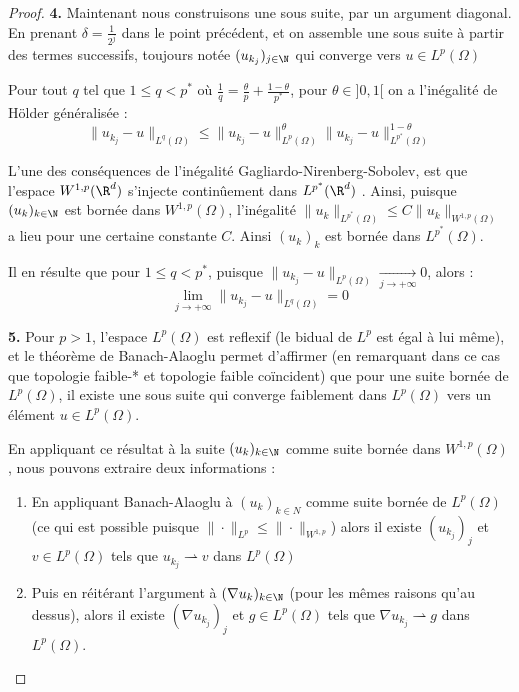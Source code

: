 \begin{proof}
    \vspace{1em}

    \textbf{4.}
    Maintenant nous construisons une sous suite, par un argument diagonal. En prenant $\delta = \frac{1}{2^j}$ dans le point précédent, et on assemble une sous suite à partir des termes successifs, toujours notée $(u_{k_j})_{j \in \N}$ qui converge vers $u \in L^p(\Omega)$

    Pour tout $q$ tel que $1 \leq q < p^*$ où $\frac{1}{q} = \frac{\theta}{p} + \frac{1 - \theta}{p^*}$, pour $\theta \in ]0,1[$ on a l'inégalité de Hölder généralisée :
    $$\|u_{k_j} - u\|_{L^q(\Omega)} \leq \|u_{k_j} - u\|_{L^p(\Omega)}^{\theta} \|u_{k_j} - u\|_{L^{p^*}(\Omega)}^{1 - \theta} $$

    L'une des conséquences de l'inégalité Gagliardo-Nirenberg-Sobolev, est que l'espace $W^{1,p}(\R^d)$ s'injecte continûement dans $L^{p^*}(\R^d)$ \cite{Evans}.
    Ainsi, puisque $(u_k)_{k \in \N}$ est bornée dans $W^{1,p}(\Omega)$, l'inégalité $\| u_k \|_{L^{p^*}(\Omega)} \leq C \| u_k \|_{W^{1,p}(\Omega)} $ a lieu pour une certaine constante $C$. Ainsi $(u_k)_k$ est bornée dans $L^{p^*}(\Omega)$. 
    
    Il en résulte que pour $1 \leq q < p^* $, puisque $\|u_{k_j} - u \|_{L^p(\Omega)} \xrightarrow[j \to +\infty]{} 0$, alors :
    $$\underset{j \to +\infty}{\lim} \| u_{k_j} - u \|_{L^q(\Omega)} = 0 $$


    \vspace{1em}

    \textbf{5.}
    Pour $p>1$, l'espace $L^p(\Omega)$ est reflexif (le bidual de $L^p$ est égal à lui même), et le théorème de Banach-Alaoglu permet d'affirmer (en remarquant dans ce cas que topologie faible-* et topologie faible coïncident)
    que pour une suite bornée de $L^p(\Omega)$, il existe une sous suite qui converge faiblement dans $L^p(\Omega)$ vers un élément $u \in L^p(\Omega)$.
    
    En appliquant ce résultat à la suite $(u_k)_{k \in \N}$ comme suite bornée dans $W^{1,p}(\Omega)$, nous pouvons extraire deux informations :
    \begin{enumerate}
        \item En appliquant Banach-Alaoglu à $(u_k)_{k\in N}$ comme suite bornée de $L^p(\Omega)$ (ce qui est possible puisque $\|\cdot\|_{L^p} \leq \|\cdot\|_{W^{1,p}}$) alors il existe $(u_{k_j})_j$ et $v \in L^p(\Omega)$ tels que $u_{k_j} \rightharpoonup v$ dans $L^p(\Omega)$
        \item Puis en réitérant l'argument à $(\nabla u_k)_{k \in \N}$ (pour les mêmes raisons qu'au dessus), alors il existe $(\nabla u_{k_j})_j$ et $g\in L^p(\Omega)$ tels que $\nabla u_{k_j} \rightharpoonup g$ dans $L^p(\Omega)$.
    \end{enumerate}


\end{proof}

